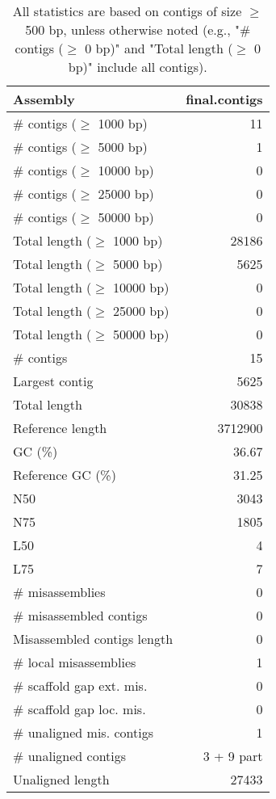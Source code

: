 \documentclass[12pt,a4paper]{article}
\begin{document}
\begin{table}[ht]
\begin{center}
\caption{All statistics are based on contigs of size $\geq$ 500 bp, unless otherwise noted (e.g., "\# contigs ($\geq$ 0 bp)" and "Total length ($\geq$ 0 bp)" include all contigs).}
\begin{tabular}{|l*{1}{|r}|}
\hline
Assembly & final.contigs \\ \hline
\# contigs ($\geq$ 1000 bp) & 11 \\ \hline
\# contigs ($\geq$ 5000 bp) & 1 \\ \hline
\# contigs ($\geq$ 10000 bp) & 0 \\ \hline
\# contigs ($\geq$ 25000 bp) & 0 \\ \hline
\# contigs ($\geq$ 50000 bp) & 0 \\ \hline
Total length ($\geq$ 1000 bp) & 28186 \\ \hline
Total length ($\geq$ 5000 bp) & 5625 \\ \hline
Total length ($\geq$ 10000 bp) & 0 \\ \hline
Total length ($\geq$ 25000 bp) & 0 \\ \hline
Total length ($\geq$ 50000 bp) & 0 \\ \hline
\# contigs & 15 \\ \hline
Largest contig & 5625 \\ \hline
Total length & 30838 \\ \hline
Reference length & 3712900 \\ \hline
GC (\%) & 36.67 \\ \hline
Reference GC (\%) & 31.25 \\ \hline
N50 & 3043 \\ \hline
N75 & 1805 \\ \hline
L50 & 4 \\ \hline
L75 & 7 \\ \hline
\# misassemblies & 0 \\ \hline
\# misassembled contigs & 0 \\ \hline
Misassembled contigs length & 0 \\ \hline
\# local misassemblies & 1 \\ \hline
\# scaffold gap ext. mis. & 0 \\ \hline
\# scaffold gap loc. mis. & 0 \\ \hline
\# unaligned mis. contigs & 1 \\ \hline
\# unaligned contigs & 3 + 9 part \\ \hline
Unaligned length & 27433 \\ \hline

\end{tabular}
\end{center}
\end{table}
\end{document}
